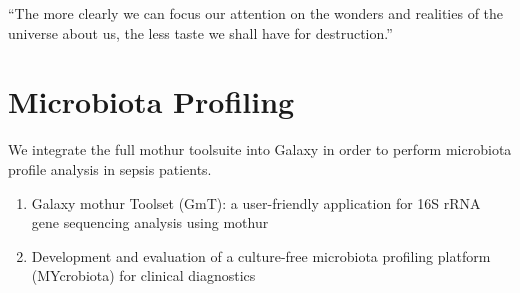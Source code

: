 \begin{savequote}[75mm]
“The more clearly we can focus our attention on the wonders and realities of the universe about us, the less taste we shall have for destruction.”
\end{savequote}

\chapter{Microbiota Profiling}\label{chapter:microbiota}
\setcounter{figure}{-1}
\setcounter{table}{-1}
\setcounter{section}{-1}

We integrate the full mothur toolsuite into Galaxy in order to perform microbiota profile analysis in sepsis patients.

\begin{enumerate}
\item Galaxy mothur Toolset (GmT): a user-friendly application for 16S rRNA gene sequencing analysis using mothur
\item Development and evaluation of a culture-free microbiota profiling platform (MYcrobiota) for clinical diagnostics
\end{enumerate}
